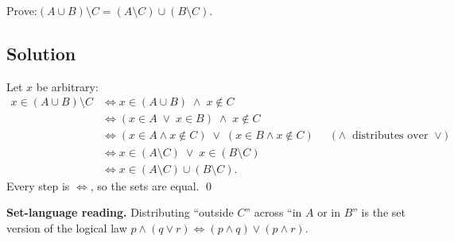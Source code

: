 \documentclass[12pt, a4paper]{article}
\begin{document}
\begin{problembox}
Prove:\quad $(A \cup B) \setminus C = (A \setminus C) \cup (B \setminus C)$.
\end{problembox}

\subsection*{Solution}

Let $x$ be arbitrary:
\begin{align*}
  x \in (A \cup B) \setminus C
  &\iff x \in (A \cup B) \;\land\; x \notin C \\
  &\iff (x \in A \;\lor\; x \in B) \;\land\; x \notin C \\
  &\iff (x \in A \land x \notin C)
        \;\lor\; (x \in B \land x \notin C)
        && \text{($\land$ distributes over $\lor$)} \\
  &\iff x \in (A \setminus C) \;\lor\; x \in (B \setminus C) \\
  &\iff x \in (A \setminus C) \cup (B \setminus C).
\end{align*}
Every step is $\iff$, so the sets are equal. \qed

\smallskip
\textbf{Set-language reading.}\; Distributing ``outside $C$'' across ``in $A$ or in $B$'' is the set version of the logical law $p \land (q \lor r) \iff (p \land q) \lor (p \land r)$.
\end{document}
